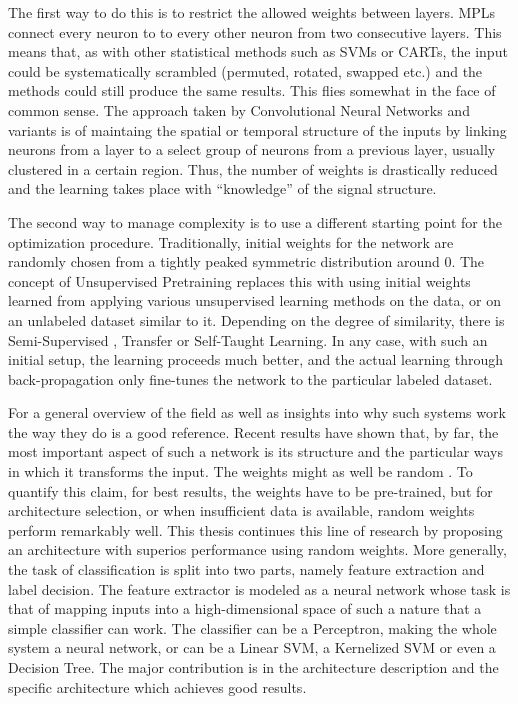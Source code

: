 \documentclass[12pt,a4paper,oneside,english]{UPBThesis}
\begin{document}
The first way to do this is to restrict the allowed weights between layers. MPLs connect every neuron to to every other neuron from two consecutive layers. This means that, as with other statistical methods such as SVMs or CARTs, the input could be systematically scrambled (permuted, rotated, swapped etc.) and the methods could still produce the same results. This flies somewhat in the face of common sense. The approach taken by Convolutional Neural Networks \cite{gradient-based-learning} and variants is of maintaing the spatial or temporal structure of the inputs by linking neurons from a layer to a select group of neurons from a previous layer, usually clustered in a certain region. Thus, the number of weights is drastically reduced and the learning takes place with ``knowledge'' of the signal structure.

The second way to manage complexity is to use a different starting point for the optimization procedure. Traditionally, initial weights for the network are randomly chosen from a tightly peaked symmetric distribution around $0$. The concept of Unsupervised Pretraining replaces this with using initial weights learned from applying various unsupervised learning methods on the data, or on an unlabeled dataset similar to it. Depending on the degree of similarity, there is Semi-Supervised \cite{text-classification-semi-supervised}, Transfer \cite{text-classification-semi-supervised} or Self-Taught \cite{self-taught-learning} Learning. In any case, with such an initial setup, the learning proceeds much better, and the actual learning through back-propagation only fine-tunes the network to the particular labeled dataset.

For a general overview of the field as well as insights into why such systems work the way they do \cite{learning-deep-architectures-AI} is a good reference. Recent results have shown that, by far, the most important aspect of such a network is its structure and the particular ways in which it transforms the input. The weights might as well be random \cite{random-weights-feature-learning,beyond-simple-features}. To quantify this claim, for best results, the weights have to be pre-trained, but for architecture selection, or when insufficient data is available, random weights perform remarkably well. This thesis continues this line of research by proposing an architecture with superios performance using random weights. More generally, the task of classification is split into two parts, namely feature extraction and label decision. The feature extractor is modeled as a neural network whose task is that of mapping inputs into a high-dimensional space of such a nature that a simple classifier can work. The classifier can be a Perceptron, making the whole system a neural network, or can be a Linear SVM, a Kernelized SVM or even a Decision Tree. The major contribution is in the architecture description and the specific architecture which achieves good results.
\end{document}
